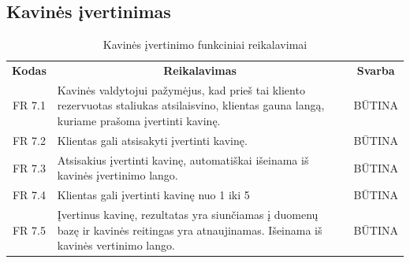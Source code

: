 \documentclass{VUMIFPSkursinis}
\begin{document}
\subsection{Kavinės įvertinimas}
\begin{center}
	\begin{table}[H]
	\caption{Kavinės įvertinimo funkciniai reikalavimai}
	\begin{tabular}{|p{2cm}|p{}|p{}|}
	
	\hline
	    \rowcolor{lightgray}
		\multicolumn{3}{|c|}{Kavinės įvertinimas}\\
		
	\hline
		\multicolumn{1}{|c|}{{\bfseries Kodas}}&
		\multicolumn{1}{|c|}{{\bfseries Reikalavimas}}&
		\multicolumn{1}{|c|}{{\bfseries Svarba}}\\

	\hline
	
		\multicolumn{1}{|c|}{FR 7.1}&
		{Kavinės valdytojui pažymėjus, kad prieš tai kliento rezervuotas staliukas atsilaisvino, klientas gauna langą, kuriame prašoma įvertinti kavinę.}&
		\multicolumn{1}{|c|}{BŪTINA}\\				
	\hline
	
		\multicolumn{1}{|c|}{FR 7.2}&
		{Klientas gali atsisakyti įvertinti kavinę.}&
		\multicolumn{1}{|c|}{BŪTINA}\\				
	\hline
	
		\multicolumn{1}{|c|}{FR 7.3}&
		{Atsisakius įvertinti kavinę, automatiškai išeinama iš kavinės įvertinimo lango.}&
		\multicolumn{1}{|c|}{BŪTINA}\\				
	\hline
	
		\multicolumn{1}{|c|}{FR 7.4}&
		{Klientas gali įvertinti kavinę nuo 1 iki 5}&
		\multicolumn{1}{|c|}{BŪTINA}\\				
	\hline
	
		\multicolumn{1}{|c|}{FR 7.5}&
		{Įvertinus kavinę, rezultatas yra siunčiamas į duomenų bazę ir kavinės reitingas yra atnaujinamas. Išeinama iš kavinės vertinimo lango.}&
		\multicolumn{1}{|c|}{BŪTINA}\\				
	\hline	
	
	\end{tabular}		
	
	\label{table:KavinėsĮvertinimas}
	\end{table}


\end{center}
\pagebreak
\end{document}
